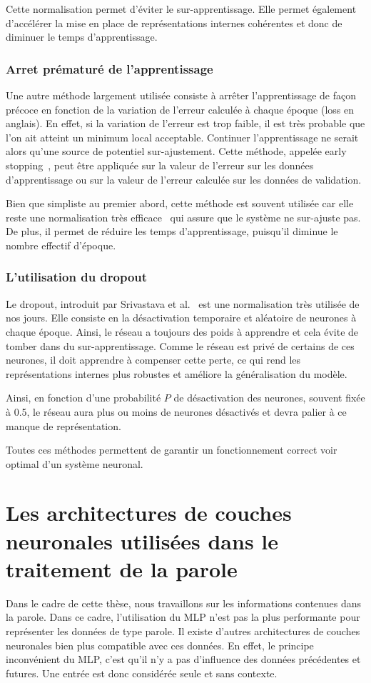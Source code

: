 Cette normalisation permet d'éviter le sur-apprentissage. Elle permet également d'accélérer la mise en place de représentations internes cohérentes et donc de diminuer le temps d'apprentissage.

\subsubsection{Arret prématuré de l'apprentissage}
Une autre méthode largement utilisée consiste à arrêter l'apprentissage de façon précoce en fonction de la variation de l'erreur calculée à chaque époque (loss en anglais). En effet, si la variation de l'erreur est trop faible, il est très probable que l'on ait atteint un minimum local acceptable. Continuer l'apprentissage ne serait alors qu'une source de potentiel sur-ajustement. Cette méthode, appelée early stopping~\cite{Prechelt1996}, peut être appliquée sur la valeur de l'erreur sur les données d'apprentissage ou sur la valeur de l'erreur calculée sur les données de validation.

Bien que simpliste au premier abord, cette méthode est souvent utilisée car elle reste une normalisation très efficace~\cite{Finnoff1993} qui assure que le système ne sur-ajuste pas. De plus, il permet de réduire les temps d'apprentissage, puisqu'il diminue le nombre effectif d'époque.

\subsubsection{L'utilisation du dropout}
Le dropout, introduit par Srivastava et al.~\cite{Srivastava2014} est une normalisation très utilisée de nos jours. Elle consiste en la désactivation temporaire et aléatoire de neurones à chaque époque. Ainsi, le réseau a toujours des poids à apprendre et cela évite de tomber dans du sur-apprentissage. Comme le réseau est privé de certains de ces neurones, il doit apprendre à compenser cette perte, ce qui rend les représentations internes plus robustes et améliore la généralisation du modèle.

Ainsi, en fonction d'une probabilité $P$ de désactivation des neurones, souvent fixée à 0.5, le réseau aura plus ou moins de neurones désactivés et devra palier à ce manque de représentation.

Toutes ces méthodes permettent de garantir un fonctionnement correct voir optimal d'un système neuronal.

\section{Les architectures de couches neuronales utilisées dans le traitement de la parole}
Dans le cadre de cette thèse, nous travaillons sur les informations contenues dans la parole. Dans ce cadre, l'utilisation du MLP n'est pas la plus performante pour représenter les données de type parole. Il existe d'autres architectures de couches neuronales bien plus compatible avec ces données. En effet, le principe inconvénient du MLP, c'est qu'il n'y a pas d'influence des données précédentes et futures. Une entrée est donc considérée seule et sans contexte.

